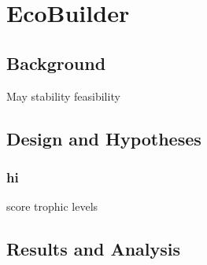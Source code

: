 \chapter{EcoBuilder}

\section{Background}
May stability
feasibility

\section{Design and Hypotheses}
\subsection{hi}
score
trophic levels

\section{Results and Analysis}

